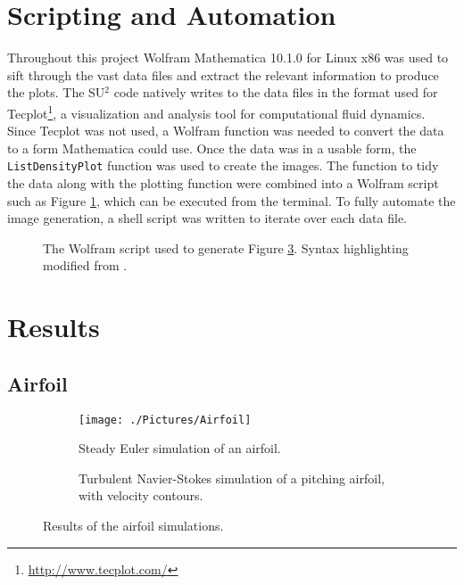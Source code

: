 \documentclass[10pt, titlepage]{article}
\begin{document}
\section{Scripting and Automation}

Throughout this project Wolfram Mathematica 10.1.0 for Linux x86 was used to sift through the vast data files and extract the relevant information to produce the plots. The SU$^2$ code natively writes to the data files in the format used for Tecplot\footnote{\url{http://www.tecplot.com/}}, a visualization and analysis tool for computational fluid dynamics. Since Tecplot was not used, a Wolfram function was needed to convert the data to a form Mathematica could use. Once the data was in a usable form, the \texttt{ListDensityPlot} function was used to create the images. The function to tidy the data along with the plotting function were combined into a Wolfram script such as Figure \ref{fig:script}, which can be executed from the terminal. To fully automate the image generation, a shell script was written to iterate over each data file.

\begin{figure}[p]

\caption[Automated Wolfram Script]{The Wolfram script used to generate Figure \ref{fig:airfoilanimation}. Syntax highlighting modified from \cite{syntax}.}
\label{fig:script}
\end{figure}

\newpage
\section{Results}

\subsection{Airfoil}

\begin{figure}[htbp]
\begin{subfigure}[t]{0.5\linewidth}
\centering
\texttt{[image: ./Pictures/Airfoil]}
\caption{Steady Euler simulation of an airfoil.}
\label{fig:staticairfoil}
\end{subfigure}
\begin{subfigure}[t]{0.5\textwidth}
\centering
{}
\caption{Turbulent Navier-Stokes simulation of a pitching airfoil, with velocity contours.}
\label{fig:airfoilanimation}
\end{subfigure}
\caption[Turbulent Airfoil Animation, and Laminar Airfoil Streamlines]{Results of the airfoil simulations.}
\label{fig:airfoil}
\end{figure}
\end{document}
